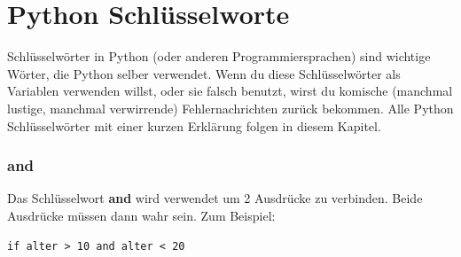 

\chapter{Python Schlüsselworte}\label{app:pythonkeywords}

Schlüsselwörter in Python (oder anderen Programmiersprachen) sind wichtige Wörter, die Python selber verwendet. Wenn du diese Schlüsselwörter als Variablen verwenden willst, oder sie falsch benutzt, wirst du komische (manchmal lustige, manchmal verwirrende) Fehlernachrichten zurück bekommen. Alle Python Schlüsselwörter mit einer kurzen Erklärung folgen in diesem Kapitel.

\subsection*{and}

Das Schlüsselwort \textbf{and} wird verwendet um 2 Ausdrücke zu verbinden. Beide Ausdrücke müssen dann wahr sein. Zum Beispiel:

\begin{Verbatim}[frame=single]
if alter > 10 and alter < 20
\end{Verbatim}

